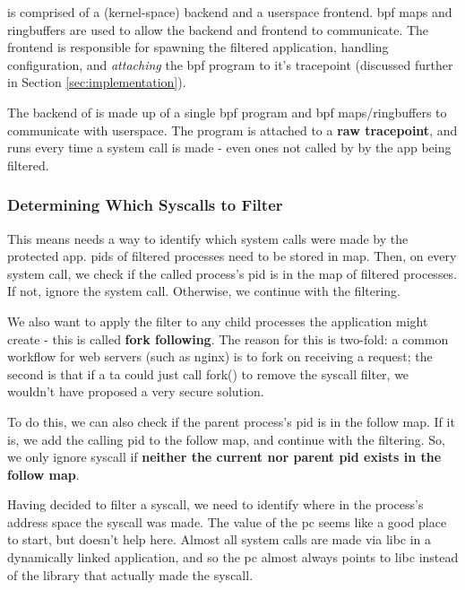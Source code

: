 \af is comprised of a (kernel-space) backend and a userspace frontend.
\ac{bpf} maps and ringbuffers are used to allow the backend and frontend to
communicate. The frontend is responsible for spawning the filtered application,
handling configuration, and \textit{attaching} the \ac{bpf} program to it's
tracepoint (discussed further in Section \ref{sec:implementation}).

The backend of \af is made up of a single \ac{bpf} program and \ac{bpf}
maps/ringbuffers to communicate with userspace.
The program is attached to a \textbf{raw tracepoint}, and runs every time
a system call is made - even ones not called by by the app being filtered.

\subsubsection{Determining Which Syscalls to
Filter}\label{subsec:design-fork-following}

This means \af needs a way to identify which system calls were made by the
protected app. \acp{pid} of filtered processes
need to be stored in  map. Then, on every system call, we check if the
called process's \ac{pid} is in the map of filtered processes. If not, ignore
the system call. Otherwise, we continue with the filtering.

We also want to apply the filter to any child processes the
application might create - this is called \textbf{fork following}. The reason for this is two-fold: a common workflow for
web servers (such as nginx) is to fork on receiving a request; the second is
that if a \ac{ta} could just call fork() to remove the syscall filter, we
wouldn't have proposed a very secure solution.


To do this, we can also check if the parent process's \ac{pid} is in the follow
map. If it is, we add the calling \ac{pid} to the follow map, and continue with
the filtering. So, we only ignore syscall if \textbf{neither the current nor
parent \ac{pid} exists in the follow map}.

Having decided to filter a syscall, we need to identify where in the process's
address space the syscall was made. The value of the \ac{pc} seems like a good
place to start, but doesn't help here.
Almost all system calls are made via \ac{libc} in a dynamically linked 
application, and so the \ac{pc} almost always points to \ac{libc} instead of the
library that actually made the syscall.


